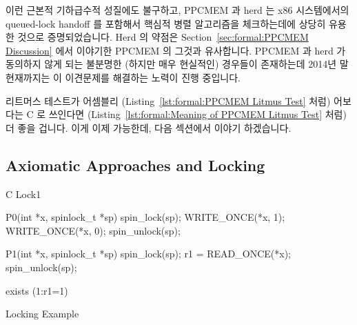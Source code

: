 이런 근본적 기하급수적 성질에도 불구하고, PPCMEM 과 herd 는 x86 시스템에서의
queued-lock handoff 를 포함해서 핵심적 병렬 알고리즘을 체크하는데에 상당히
유용한 것으로 증명되었습니다.
Herd 의 약점은
Section~\ref{sec:formal:PPCMEM Discussion} 에서 이야기한 PPCMEM 의 그것과
유사합니다.
PPCMEM 과 herd 가 동의하지 않게 되는 불분명한 (하지만 매우 현실적인) 경우들이
존재하는데 2014년 말 현재까지는 이 이견문제를 해결하는 노력이 진행 중입니다.
\iffalse

Despite their exponential nature, both PPCMEM and herd have proven quite
useful for checking key parallel algorithms, including the queued-lock
handoff on x86 systems.
The weaknesses of the herd tool are similar to those of PPCMEM, which
were described in
Section~\ref{sec:formal:PPCMEM Discussion}.
There are some obscure (but very real) cases for which the PPCMEM and
herd tools disagree, and as of late 2014 resolving these disagreements
was ongoing.
\fi

리트머스 테스트가 어셈블리
(Listing~\ref{lst:formal:PPCMEM Litmus Test} 처럼) 어보다는 C 로 쓰인다면
(Listing~\ref{lst:formal:Meaning of PPCMEM Litmus Test} 처럼) 더 좋을 겁니다.
이게 이제 가능한데, 다음 섹션에서 이야기 하겠습니다.
\iffalse

It would be helpful if the litmus tests could be written in C
(as in Listing~\ref{lst:formal:Meaning of PPCMEM Litmus Test})
rather than assembly
(as in Listing~\ref{lst:formal:PPCMEM Litmus Test}).
This is now possible, as will be described in the following sections.
\fi

\subsection{Axiomatic Approaches and Locking}
\label{sec:formal:Axiomatic Approaches and Locking}

\begin{listing}[tb]
\begin{linelabel}
\begin{VerbatimL}[commandchars=\\\[\]]
C Lock1

{
}

P0(int *x, spinlock_t *sp)
{
	spin_lock(sp);
	WRITE_ONCE(*x, 1);
	WRITE_ONCE(*x, 0);
	spin_unlock(sp);
}

P1(int *x, spinlock_t *sp)
{
	spin_lock(sp);
	r1 = READ_ONCE(*x);
	spin_unlock(sp);
}

exists (1:r1=1)
\end{VerbatimL}
\end{linelabel}
\caption{Locking Example}
\label{lst:formal:Locking Example}
\end{listing}

